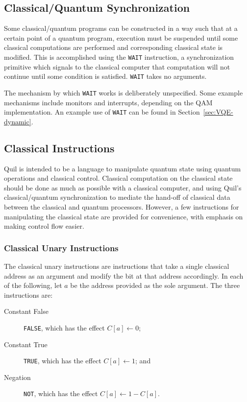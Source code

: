 \documentclass[conference]{IEEEtran}
\begin{document}
\subsection{Classical/Quantum Synchronization}
Some classical/quantum programs can be constructed in a way such that at a certain point of a quantum program, execution must be suspended until some classical computations are performed and corresponding classical state is modified. This is accomplished using the \verb|WAIT| instruction, a synchronization primitive which signals to the classical computer that computation will not continue until some condition is satisfied. \verb|WAIT| takes no arguments.

The mechanism by which \verb|WAIT| works is deliberately unspecified. Some example mechanisms include monitors and interrupts, depending on the QAM implementation. An example use of \verb|WAIT| can be found in Section~\ref{sec:VQE-dynamic}.

\subsection{Classical Instructions}
Quil is intended to be a language to manipulate quantum state using quantum operations and classical control. Classical computation on the classical state should be done as much as possible with a classical computer, and using Quil's classical/quantum synchronization to mediate the hand-off of classical data between the classical and quantum processors. However, a few instructions for manipulating the classical state are provided for convenience, with emphasis on making control flow easier.

\subsubsection{Classical Unary Instructions}
The classical unary instructions are instructions that take a single classical address as an argument and modify the bit at that address accordingly. In each of the following, let $a$ be the address provided as the sole argument. The three instructions are:
\begin{description}
    \item[Constant False] \verb|FALSE|, which has the effect $C[a] \leftarrow 0$;
    \item[Constant True] \verb|TRUE|, which has the effect $C[a] \leftarrow 1$; and
    \item[Negation] \verb|NOT|, which has the effect $C[a] \leftarrow 1 - C[a]$.
\end{description}
\end{document}
